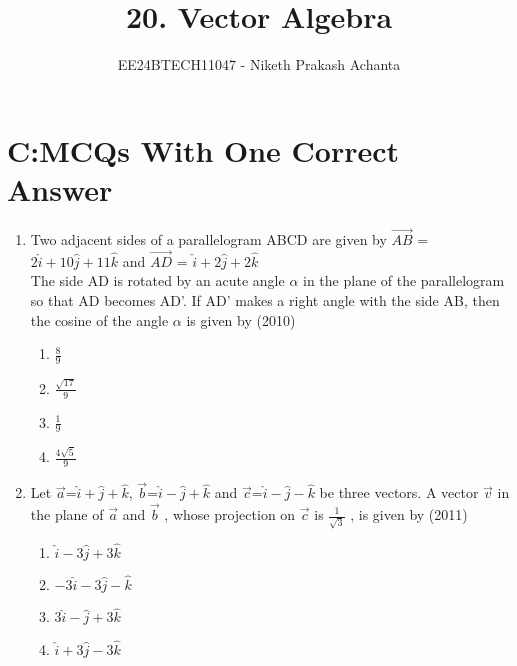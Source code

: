 \documentclass[journal,12pt,twocolumn]{IEEEtran}
\theoremstyle{remark}
\begin{document}

\vspace{3cm}

\title{20. Vector Algebra}
\author{EE24BTECH11047 - Niketh Prakash Achanta}
\maketitle
\newpage
\bigskip
\section{C:MCQs With One Correct Answer}
\renewcommand{\thefigure}{\theenumi}
\renewcommand{\thetable}{\theenumi}
\begin{enumerate}[start=41]
	\item %
Two adjacent sides of a parallelogram ABCD are given by $\overrightarrow{AB}$ = $2\hat{i}+10\hat{j}+11\hat{k}$ and $\overrightarrow{AD}$ = $\hat{i}+2\hat{j}+2\hat{k}$ \\
The side AD is rotated by an acute angle $\alpha$ in the plane of the parallelogram so that AD becomes AD'. If AD' makes a right angle with the side AB, then the cosine of the angle $\alpha$ is given by \hfill{(2010)}\\
\begin{enumerate}
	\item $\frac{8}{9}$
	\item $\frac{\sqrt{17}}{9}$
	\item $\frac{1}{9}$
	\item $\frac{4\sqrt{5}}{9}$\\
\end{enumerate}

        \item %
Let $\overrightarrow{a}$=$\hat{i}+\hat{j}+\hat{k}$, $\overrightarrow{b}$=$\hat{i}-\hat{j}+\hat{k}$ and $\overrightarrow{c}$=$\hat{i}-\hat{j}-\hat{k}$ be three vectors. A vector $\overrightarrow{v}$ in the plane of $\overrightarrow{a}$ and $\overrightarrow{b}$ , whose projection on $\overrightarrow{c}$ is $\frac{1}{\sqrt{3}}$ , is given by \hfill{(2011)}\\
\begin{enumerate}
	\item $\hat{i}-3\hat{j}+3\hat{k}$
        \item $-3\hat{i}-3\hat{j}-\hat{k}$
        \item $3\hat{i}-\hat{j}+3\hat{k}$
        \item $\hat{i}+3\hat{j}-3\hat{k}$\\
\end{enumerate}
       

\end{enumerate}
\end{document}
